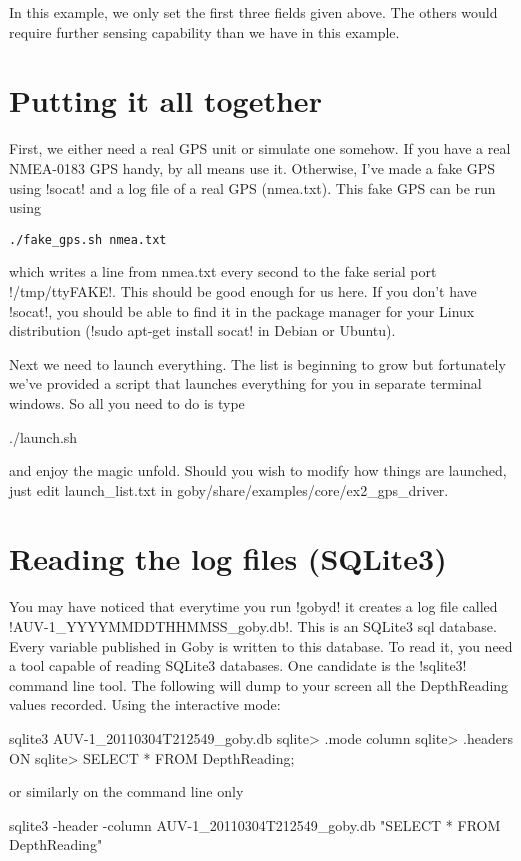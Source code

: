 In this example, we only set the first three fields given above. The others would require further sensing capability than we have in this example.

\section{Putting it all together}

First, we either need a real GPS unit or simulate one somehow. If you have a real NMEA-0183 GPS handy, by all means use it. Otherwise, I've made a fake GPS using !socat! and a log file of a real GPS (nmea.txt). This fake GPS can be run using
\begin{verbatim}
./fake_gps.sh nmea.txt
\end{verbatim}
which writes a line from nmea.txt every second to the fake serial port !/tmp/ttyFAKE!. This should be good enough for us here. If you don't have !socat!, you should be able to find it in the package manager for your Linux distribution (!sudo apt-get install socat! in Debian or Ubuntu).

Next we need to launch everything. The list is beginning to grow
\resetbvlinenumber
but fortunately we've provided a script that launches everything for you in separate terminal windows. So all you need to do is type
\begin{boxedverbatim}
./launch.sh
\end{boxedverbatim}
\resetbvlinenumber
and enjoy the magic unfold. Should you wish to modify how things are launched, just edit launch\_list.txt in goby/share/examples/core/ex2\_gps\_driver.

\section{Reading the log files (SQLite3)}

You may have noticed that everytime you run !gobyd! it creates a log file called !AUV-1_YYYYMMDDTHHMMSS_goby.db!. This is an SQLite3 \cite{sqlite} \gls{sql} database. Every variable published in Goby is written to this database. To read it, you need a tool capable of reading SQLite3 databases. One candidate is the !sqlite3! command line tool. The following will dump to your screen all the DepthReading values recorded. Using the interactive mode:
\begin{boxedverbatim}
sqlite3 AUV-1_20110304T212549_goby.db
sqlite> .mode column
sqlite> .headers ON
sqlite> SELECT * FROM DepthReading;
\end{boxedverbatim}
\resetbvlinenumber
or similarly on the command line only
\begin{boxedverbatim}
sqlite3 -header -column AUV-1_20110304T212549_goby.db "SELECT * FROM DepthReading"
\end{boxedverbatim}
\resetbvlinenumber

